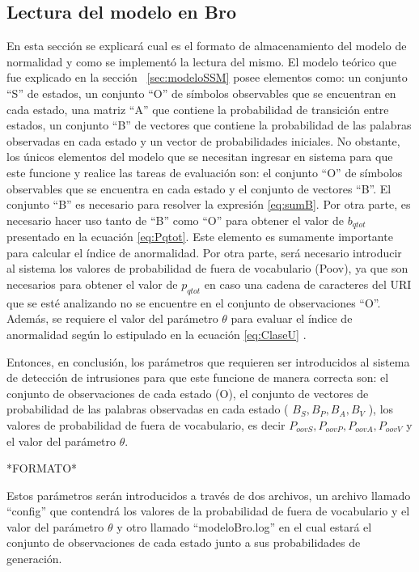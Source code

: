 \subsection{Lectura del modelo en Bro}
\label{sec:lecturaModelo}
En esta sección se explicará cual es el formato de almacenamiento del modelo de normalidad y como se implementó la lectura del mismo. El modelo teórico que fue explicado en la sección ~\ref{sec:modeloSSM} posee elementos como: un conjunto “S” de estados, un conjunto “O” de símbolos observables que se encuentran en cada estado, una matriz “A” que contiene la probabilidad de transición entre estados, un conjunto “B” de vectores que contiene la probabilidad de las palabras observadas en cada estado y un vector de probabilidades iniciales. No obstante, los únicos elementos del modelo que se necesitan ingresar en sistema para que este funcione y realice las tareas de evaluación son: el conjunto “O” de símbolos observables que se encuentra en cada estado y el conjunto de vectores “B”. El conjunto “B” es necesario para resolver la expresión \ref{eq:sumB}. Por otra parte, es necesario hacer uso tanto de “B” como “O” para obtener el valor de $b_{qtot}$ presentado en la ecuación \ref{eq:Pqtot}. Este elemento es sumamente importante para calcular el índice de anormalidad. Por otra parte, será necesario introducir al sistema los valores de probabilidad de fuera de vocabulario (Poov), ya que son necesarios para obtener el valor de $p_{qtot}$ en caso una cadena de caracteres del URI que se esté analizando no se encuentre en el conjunto de observaciones “O”. Además, se requiere el valor del parámetro $\theta$ para evaluar el índice de anormalidad según lo estipulado en la ecuación \ref{eq:ClaseU} .

    Entonces, en conclusión, los parámetros que requieren ser introducidos al sistema de detección de intrusiones para que este funcione de manera correcta son: el conjunto de observaciones de cada estado (O), el conjunto de vectores de probabilidad de las palabras observadas en cada estado ( $B_{S}, B_{P}, B_{A}, B_{V}$ ), los valores de probabilidad de fuera de vocabulario, es decir $P_{oovS}, P_{oovP}, P_{oovA}, P_{oovV}$ y el valor del parámetro $\theta$.

    *FORMATO*

Estos parámetros serán introducidos a través de dos archivos, un archivo llamado “config” que contendrá los valores de la probabilidad de fuera de vocabulario y el valor del parámetro $\theta$ y otro llamado “modeloBro.log” en el cual estará el conjunto de observaciones de cada estado junto a sus probabilidades de generación.

